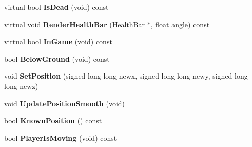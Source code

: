 \begin{DoxyCompactItemize}
\item 
\hypertarget{classplayer_a1862f089ce1d4b1ae0c27cbc89f3d62e}{virtual bool {\bfseries \-Is\-Dead} (void) const }\label{classplayer_a1862f089ce1d4b1ae0c27cbc89f3d62e}

\item 
\hypertarget{classplayer_adcdc22d5c55604633367b67534fdb2b5}{virtual void {\bfseries \-Render\-Health\-Bar} (\hyperlink{classHealthBar}{\-Health\-Bar} $\ast$, float angle) const }\label{classplayer_adcdc22d5c55604633367b67534fdb2b5}

\item 
\hypertarget{classplayer_a0fb5b7037a769f799f8676132a8734a3}{virtual bool {\bfseries \-In\-Game} (void) const }\label{classplayer_a0fb5b7037a769f799f8676132a8734a3}

\item 
\hypertarget{classplayer_a6b27f5740d57047856427bdd22b8a1eb}{bool {\bfseries \-Below\-Ground} (void) const }\label{classplayer_a6b27f5740d57047856427bdd22b8a1eb}

\item 
\hypertarget{classplayer_a397e823a7b348d77cd41a43d7855d994}{void {\bfseries \-Set\-Position} (signed long long newx, signed long long newy, signed long long newz)}\label{classplayer_a397e823a7b348d77cd41a43d7855d994}

\item 
\hypertarget{classplayer_a55d31c3abd14980e93074bf3c8051315}{void {\bfseries \-Update\-Position\-Smooth} (void)}\label{classplayer_a55d31c3abd14980e93074bf3c8051315}

\item 
\hypertarget{classplayer_a3ca3f0997636944be261bfa5120041ea}{bool {\bfseries \-Known\-Position} () const }\label{classplayer_a3ca3f0997636944be261bfa5120041ea}

\item 
\hypertarget{classplayer_a2e6f48ac250986cdcde88f949a05c2db}{bool {\bfseries \-Player\-Is\-Moving} (void) const }\label{classplayer_a2e6f48ac250986cdcde88f949a05c2db}

\end{DoxyCompactItemize}
